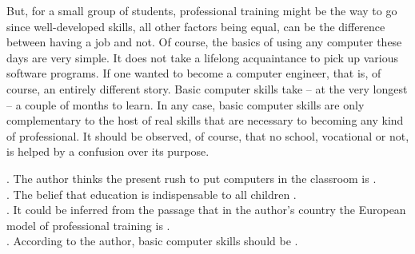 But, for a small group of students, professional training might be the way to go since well-developed skills, all other factors being equal, can be the difference between having a job and not. Of course, the basics of using any computer these days are very simple. It does not take a lifelong acquaintance to pick up various software programs. If one wanted to become a computer engineer, that is, of course, an entirely different story. Basic computer skills take -- at the very longest -- a couple of months to learn. In any case, basic computer skills are only complementary to the host of real skills that are necessary to becoming any kind of professional. It should be observed, of course, that no school, vocational or not, is helped by a confusion over its purpose.
\begin{questions}   .	The author thinks the present rush to put computers in the classroom is \ltk{}.\\
 .	The belief that education is indispensable to all children \ltk{}.\\
 .	It could be inferred from the passage that in the author’s country the European model of professional training is \ltk{}.\\
 .	According to the author, basic computer skills should be \ltk{}.\\
\end{questions}
